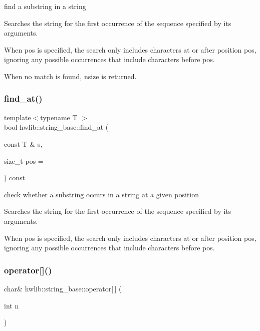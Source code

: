 find a substring in a string

Searches the string for the first occurrence of the sequence specified by its arguments.

When pos is specified, the search only includes characters at or after position pos, ignoring any possible occurrences that include characters before pos.

When no match is found, nsize is returned. \mbox{\label{classhwlib_1_1string__base_aa51e77269adf93d83269e99fa533d1e2}} 
\subsubsection{\texorpdfstring{find\+\_\+at()}{find\_at()}}
{\footnotesize\ttfamily template$<$typename T $>$ \\
bool hwlib\+::string\+\_\+base\+::find\+\_\+at (\begin{DoxyParamCaption}\item[{const T \&}]{s,  }\item[{size\+\_\+t}]{pos = {} }\end{DoxyParamCaption}) const\hspace{0.3cm}{\ttfamily [inline]}}

check whether a substring occurs in a string at a given position

Searches the string for the first occurrence of the sequence specified by its arguments.

When pos is specified, the search only includes characters at or after position pos, ignoring any possible occurrences that include characters before pos. \mbox{\label{classhwlib_1_1string__base_a37cf103e3c4ed2d0a898f2cc8d407df2}} 
\subsubsection{\texorpdfstring{operator[]()}{operator[]()}\hspace{0.1cm}{\footnotesize\ttfamily [1/2]}}
{\footnotesize\ttfamily char\& hwlib\+::string\+\_\+base\+::operator\mbox{[}$\,$\mbox{]} (\begin{DoxyParamCaption}\item[{int}]{n }\end{DoxyParamCaption})\hspace{0.3cm}{\ttfamily [inline]}}

